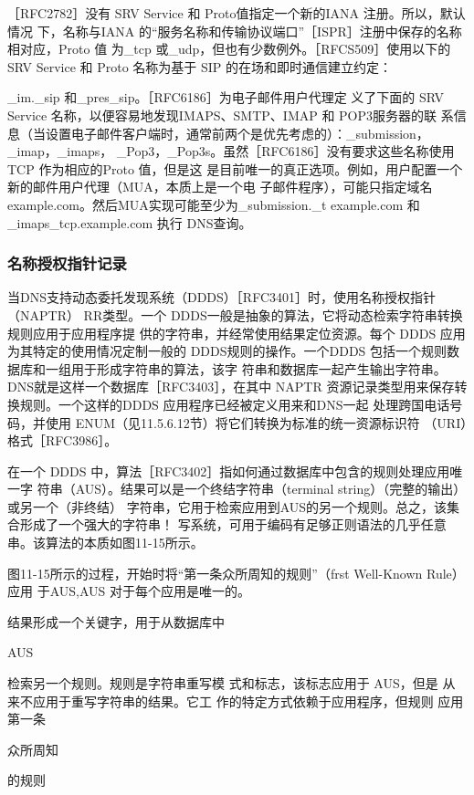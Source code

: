 ［RFC2782］没有 SRV Service 和 Proto值指定一个新的IANA 注册。所以，默认情况
下，名称与IANA 的“服务名称和传输协议端口”［ISPR］注册中保存的名称相对应，Proto 值
为\_tcp 或\_udp，但也有少数例外。［RFCS509］使用以下的 SRV Service 和 Proto 名称为基于
SIP 的在场和即时通信建立约定：

\_im.\_sip 和\_pres\_sip。［RFC6186］为电子邮件用户代理定
义了下面的 SRV Service 名称，以便容易地发现IMAPS、SMTP、IMAP 和 POP3服务器的联
系信息（当设置电子邮件客户端时，通常前两个是优先考虑的）：\_submission，\_imap，\_imaps，
\_Pop3，\_Pop3s。虽然［RFC6186］没有要求这些名称使用TCP 作为相应的Proto 值，但是这
是目前唯一的真正选项。例如，用户配置一个新的邮件用户代理（MUA，本质上是一个电
子邮件程序），可能只指定域名 example.com。然后MUA实现可能至少为\_submission.\_t
example.com 和\_imaps\_tcp.example.com 执行 DNS查询。

\subsubsection{名称授权指针记录}

当DNS支持动态委托发现系统（DDDS）［RFC3401］时，使用名称授权指针（NAPTR）
RR类型。一个 DDDS一般是抽象的算法，它将动态检索字符串转换规则应用于应用程序提
供的字符串，并经常使用结果定位资源。每个 DDDS 应用为其特定的使用情况定制一般的
DDDS规则的操作。一个DDDS 包括一个规则数据库和一组用于形成字符串的算法，该字
符串和数据库一起产生输出字符串。DNS就是这样一个数据库［RFC3403］，在其中 NAPTR
资源记录类型用来保存转换规则。一个这样的DDDS 应用程序已经被定义用来和DNS一起
处理跨国电话号码，并使用 ENUM（见11.5.6.12节）将它们转换为标准的统一资源标识符
（URI）格式［RFC3986］。

在一个 DDDS 中，算法［RFC3402］指如何通过数据库中包含的规则处理应用唯一字
符串（AUS）。结果可以是一个终结字符串（terminal string）（完整的输出）或另一个（非终结）
字符串，它用于检索应用到AUS的另一个规则。总之，该集合形成了一个强大的字符串！
写系统，可用于编码有足够正则语法的几乎任意串。该算法的本质如图11-15所示。

图11-15所示的过程，开始时将“第一条众所周知的规则”（frst Well-Known Rule）应用
于AUS,AUS 对于每个应用是唯一的。

结果形成一个关键字，用于从数据库中

AUS

检索另一个规则。规则是字符串重写模
式和标志，该标志应用于 AUS，但是
从来不应用于重写字符串的结果。它工
作的特定方式依赖于应用程序，但规则
应用第一条

众所周知

的规则

